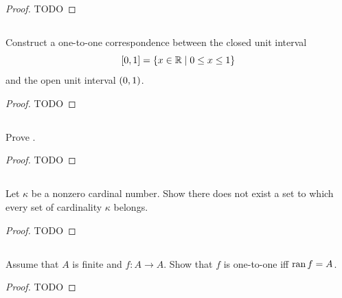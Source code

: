 \documentclass{report}
\begin{document}
  \begin{proof}
    TODO
  \end{proof}

\subsection{}%

  Construct a one-to-one correspondence between the closed unit interval
    $$\left[0, 1\right] = \{x \in \mathbb{R} \mid 0 \leq x \leq 1\}$$
    and the open unit interval $\left(0, 1\right)$.

  \begin{proof}
    TODO
  \end{proof}

\subsection{}%

  Prove .

  \begin{proof}
    TODO
  \end{proof}

\subsection{}%

  Let $\kappa$ be a nonzero cardinal number.
  Show there does not exist a set to which every set of cardinality $\kappa$
    belongs.

  \begin{proof}
    TODO
  \end{proof}

\subsection{}%

  Assume that $A$ is finite and $f \colon A \rightarrow A$.
  Show that $f$ is one-to-one iff $\mathop{\text{ran}}{f} = A$.

  \begin{proof}
    TODO
  \end{proof}

\subsection{}%
\end{document}
